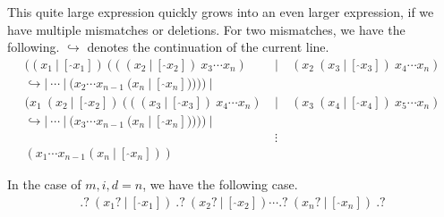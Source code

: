 \documentclass[12pt]{article}
\begin{document}
This quite large expression quickly grows into an even larger expression, if we have multiple mismatches or deletions. For two mismatches, we have the following. $\hookrightarrow$ denotes the continuation of the current line.
\begin{eqnarray}
	((x_1\ |\ [\ \hat{}x_1])\ (((x_2\ |\ [\ \hat{}x_2])\ x_3 \cdots x_n)\ &|&\ (x_2\ (x_3\ |\ [\ \hat{}x_3])\ x_4 \cdots x_n)\\
	\hookrightarrow |\ \cdots\ |\ (x_2\cdots x_{n-1}\ (x_n\ |\ [\ \hat{}x_n]))))\ | \nonumber \\
	 (x_1\ (x_2\ |\ [\ \hat{}x_2])\ (((x_3\ |\ [\ \hat{}x_3])\ x_4 \cdots x_n)\ &|&\ (x_3\ (x_4\ |\ [\ \hat{}x_4])\ x_5 \cdots x_n) \nonumber \\
	 \hookrightarrow |\ \cdots\ |\ (x_3 \cdots x_{n-1}\ (x_n\ |\ [\ \hat{}x_n]))))\ | \nonumber \\
	 & \vdots & \nonumber \\
	 (x_1\cdots x_{n-1}(x_n\ |\ [\ \hat{}x_n])) \nonumber
\end{eqnarray}

In the case of $m, i, d = n$, we have the following case.
\begin{eqnarray}
	.?\ (x_1?\ |\ [\ \hat{}x_1])\ .?\ (x_2?\ |\ [\ \hat{} x_2]) \cdots .?\ (x_n?\ |\ [\ \hat{}x_n])\ .? 
\end{eqnarray}

\end{document}
